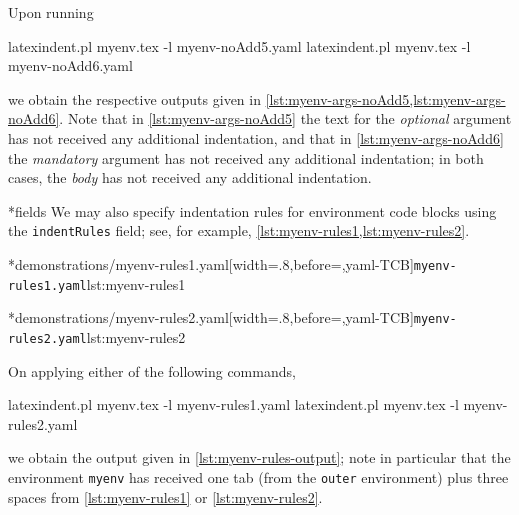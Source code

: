 	Upon running \begin{commandshell}
latexindent.pl myenv.tex -l myenv-noAdd5.yaml  
latexindent.pl myenv.tex -l myenv-noAdd6.yaml  
\end{commandshell} we obtain the respective outputs given in \cref{lst:myenv-args-noAdd5,lst:myenv-args-noAdd6}.
	Note that in \cref{lst:myenv-args-noAdd5} the text for the \emph{optional} argument has not received any additional indentation, and that in \cref{lst:myenv-args-noAdd6} the \emph{mandatory} argument has not received any additional indentation; in both cases, the \emph{body} has not received any additional indentation.

	\begin{minipage}{.45\textwidth}
	\end{minipage}
	\hfill
	\begin{minipage}{.45\textwidth}
	\end{minipage}

*{fields}
	We may also specify indentation rules for environment code blocks using the \texttt{indentRules} field; see, for example, \cref{lst:myenv-rules1,lst:myenv-rules2}.

	\begin{minipage}{.45\textwidth}
		\cmhlistingsfromfile[style=yaml-LST]*{demonstrations/myenv-rules1.yaml}[width=.8\linewidth,before=\centering,yaml-TCB]{\texttt{myenv-rules1.yaml}}{lst:myenv-rules1}
	\end{minipage}
	\hfill
	\begin{minipage}{.45\textwidth}
		\cmhlistingsfromfile[style=yaml-LST]*{demonstrations/myenv-rules2.yaml}[width=.8\linewidth,before=\centering,yaml-TCB]{\texttt{myenv-rules2.yaml}}{lst:myenv-rules2}
	\end{minipage}

	On applying either of the following commands, \begin{commandshell}
latexindent.pl myenv.tex -l myenv-rules1.yaml  
latexindent.pl myenv.tex -l myenv-rules2.yaml  
\end{commandshell} we obtain the output given in \cref{lst:myenv-rules-output}; note in particular that the environment \texttt{myenv} has received one tab (from the \texttt{outer} environment) plus three spaces from \cref{lst:myenv-rules1} or \ref{lst:myenv-rules2}.

